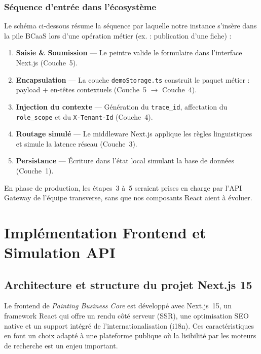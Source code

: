 \documentclass[12pt,a4paper]{report}
\begin{document}
\subsubsection{Séquence d'entrée dans l'écosystème}

Le schéma ci-dessous résume la séquence par laquelle notre instance s'insère dans la pile BCaaS lors d'une opération métier (ex. : publication d'une fiche) :

\begin{enumerate}
    \item \textbf{Saisie \& Soumission} --- Le peintre valide le formulaire dans l'interface Next.js (Couche~5).
    \item \textbf{Encapsulation} --- La couche \texttt{demoStorage.ts} construit le paquet métier : payload + en-têtes contextuels (Couche~5 $\rightarrow$ Couche~4).
    \item \textbf{Injection du contexte} --- Génération du \texttt{trace\_id}, affectation du \texttt{role\_scope} et du \texttt{X-Tenant-Id} (Couche~4).
    \item \textbf{Routage simulé} --- Le middleware Next.js applique les règles linguistiques et simule la latence réseau (Couche~3).
    \item \textbf{Persistance} --- Écriture dans l'état local simulant la base de données (Couche~1).
\end{enumerate}

En phase de production, les étapes~3 à~5 seraient prises en charge par l'API Gateway de l'équipe transverse, sans que nos composants React aient à évoluer.

\newpage
\section{Implémentation Frontend et Simulation API}

\subsection{Architecture et structure du projet Next.js 15}

Le frontend de \textit{Painting Business Core} est développé avec Next.js~15,
un framework React qui offre un rendu côté serveur (SSR), une optimisation SEO
native et un support intégré de l'internationalisation (i18n). Ces
caractéristiques en font un choix adapté à une plateforme publique où la
lisibilité par les moteurs de recherche est un enjeu important.
\end{document}
